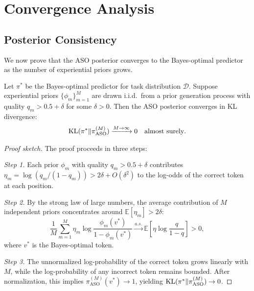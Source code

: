 \section{Convergence Analysis}

\label{sec:convergence}

\subsection{Posterior Consistency}

We now prove that the ASO posterior converges to the Bayes-optimal predictor as
the number of experiential priors grows.

\begin{theorem}
\label{thm:consistency}
Let $\pi^*$ be the Bayes-optimal predictor for task distribution $\mathcal{D}$.
Suppose experiential priors $\{\phi_m\}_{m=1}^M$ are drawn i.i.d.\ from a prior
generation process with quality $q_m > 0.5 + \delta$ for some $\delta > 0$.
Then the ASO posterior converges in KL divergence:
\begin{equation}
    \operatorname{KL}(\pi^* \| \pi_{\text{ASO}}^{(M)}) \xrightarrow{M \to \infty} 0
    \quad \text{almost surely}.
\end{equation}
\end{theorem}

\begin{proof}[Proof sketch]
The proof proceeds in three steps:

\textit{Step 1.} Each prior $\phi_m$ with quality $q_m > 0.5 + \delta$
contributes $\eta_m = \log(q_m / (1-q_m)) > 2\delta + O(\delta^2)$ to the
log-odds of the correct token at each position.

\textit{Step 2.} By the strong law of large numbers, the average contribution
of $M$ independent priors concentrates around $\mathbb{E}[\eta_m] > 2\delta$:
\begin{equation}
    \frac{1}{M} \sum_{m=1}^M \eta_m \log \frac{\phi_m(v^*)}{1 - \phi_m(v^*)}
    \xrightarrow{a.s.} \mathbb{E}\left[\eta \log \frac{q}{1-q}\right] > 0,
\end{equation}
where $v^*$ is the Bayes-optimal token.

\textit{Step 3.} The unnormalized log-probability of the correct token grows
linearly with $M$, while the log-probability of any incorrect token remains
bounded. After normalization, this implies $\pi_{\text{ASO}}^{(M)}(v^*) \to 1$,
yielding $\operatorname{KL}(\pi^* \| \pi_{\text{ASO}}^{(M)}) \to 0$.
\end{proof}

